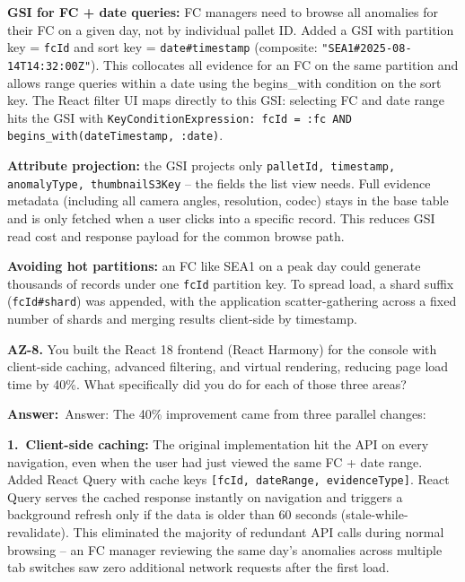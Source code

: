 \documentclass[letterpaper,10pt]{article}
\newlength{\boxwidth}
\newcommand{\answerlabel}{\noindent\textbf{\textcolor{answerblue}{Answer:}}~}
\begin{document}
\textbf{GSI for FC + date queries:} FC managers need to browse all anomalies for their FC on a given day, not by individual pallet ID. Added a GSI with partition key = \texttt{fcId} and sort key = \texttt{date\#timestamp} (composite: \texttt{"SEA1\#2025-08-14T14:32:00Z"}). This collocates all evidence for an FC on the same partition and allows range queries within a date using the begins\_with condition on the sort key. The React filter UI maps directly to this GSI: selecting FC and date range hits the GSI with \texttt{KeyConditionExpression: fcId = :fc AND begins\_with(dateTimestamp, :date)}.

\textbf{Attribute projection:} the GSI projects only \texttt{palletId, timestamp, anomalyType, thumbnailS3Key} -- the fields the list view needs. Full evidence metadata (including all camera angles, resolution, codec) stays in the base table and is only fetched when a user clicks into a specific record. This reduces GSI read cost and response payload for the common browse path.

\textbf{Avoiding hot partitions:} an FC like SEA1 on a peak day could generate thousands of records under one \texttt{fcId} partition key. To spread load, a shard suffix (\texttt{fcId\#shard}) was appended, with the application scatter-gathering across a fixed number of shards and merging results client-side by timestamp.

\vspace{6pt}

\colorbox{qbg}{\begin{minipage}{\boxwidth}
\textbf{AZ-8.} You built the React 18 frontend (React Harmony) for the console with client-side caching, advanced filtering, and virtual rendering, reducing page load time by 40\%. What specifically did you do for each of those three areas?
\end{minipage}}

\vspace{2pt}
\answerlabel{Answer:} The 40\% improvement came from three parallel changes:

\textbf{1.~Client-side caching:} The original implementation hit the API on every navigation, even when the user had just viewed the same FC + date range. Added React Query with cache keys \texttt{[fcId, dateRange, evidenceType]}. React Query serves the cached response instantly on navigation and triggers a background refresh only if the data is older than 60 seconds (stale-while-revalidate). This eliminated the majority of redundant API calls during normal browsing -- an FC manager reviewing the same day's anomalies across multiple tab switches saw zero additional network requests after the first load.
\end{document}
